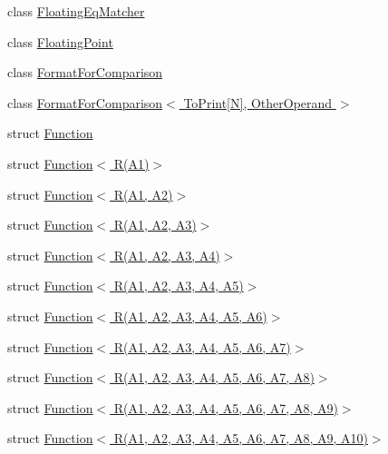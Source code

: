 \begin{DoxyCompactItemize}
\item 
class \hyperlink{classtesting_1_1internal_1_1FloatingEqMatcher}{Floating\+Eq\+Matcher}
\item 
class \hyperlink{classtesting_1_1internal_1_1FloatingPoint}{Floating\+Point}
\item 
class \hyperlink{classtesting_1_1internal_1_1FormatForComparison}{Format\+For\+Comparison}
\item 
class \hyperlink{classtesting_1_1internal_1_1FormatForComparison_3_01ToPrint[N]_00_01OtherOperand_01_4}{Format\+For\+Comparison$<$ To\+Print\mbox{[}\+N\mbox{]}, Other\+Operand $>$}
\item 
struct \hyperlink{structtesting_1_1internal_1_1Function}{Function}
\item 
struct \hyperlink{structtesting_1_1internal_1_1Function_3_01R_07A1_08_4}{Function$<$ R(\+A1)$>$}
\item 
struct \hyperlink{structtesting_1_1internal_1_1Function_3_01R_07A1_00_01A2_08_4}{Function$<$ R(\+A1, A2)$>$}
\item 
struct \hyperlink{structtesting_1_1internal_1_1Function_3_01R_07A1_00_01A2_00_01A3_08_4}{Function$<$ R(\+A1, A2, A3)$>$}
\item 
struct \hyperlink{structtesting_1_1internal_1_1Function_3_01R_07A1_00_01A2_00_01A3_00_01A4_08_4}{Function$<$ R(\+A1, A2, A3, A4)$>$}
\item 
struct \hyperlink{structtesting_1_1internal_1_1Function_3_01R_07A1_00_01A2_00_01A3_00_01A4_00_01A5_08_4}{Function$<$ R(\+A1, A2, A3, A4, A5)$>$}
\item 
struct \hyperlink{structtesting_1_1internal_1_1Function_3_01R_07A1_00_01A2_00_01A3_00_01A4_00_01A5_00_01A6_08_4}{Function$<$ R(\+A1, A2, A3, A4, A5, A6)$>$}
\item 
struct \hyperlink{structtesting_1_1internal_1_1Function_3_01R_07A1_00_01A2_00_01A3_00_01A4_00_01A5_00_01A6_00_01A7_08_4}{Function$<$ R(\+A1, A2, A3, A4, A5, A6, A7)$>$}
\item 
struct \hyperlink{structtesting_1_1internal_1_1Function_3_01R_07A1_00_01A2_00_01A3_00_01A4_00_01A5_00_01A6_00_01A7_00_01A8_08_4}{Function$<$ R(\+A1, A2, A3, A4, A5, A6, A7, A8)$>$}
\item 
struct \hyperlink{structtesting_1_1internal_1_1Function_3_01R_07A1_00_01A2_00_01A3_00_01A4_00_01A5_00_01A6_00_01A7_00_01A8_00_01A9_08_4}{Function$<$ R(\+A1, A2, A3, A4, A5, A6, A7, A8, A9)$>$}
\item 
struct \hyperlink{structtesting_1_1internal_1_1Function_3_01R_07A1_00_01A2_00_01A3_00_01A4_00_01A5_00_01A6_00_01A7_00_01A8_00_01A9_00_01A10_08_4}{Function$<$ R(\+A1, A2, A3, A4, A5, A6, A7, A8, A9, A10)$>$}

\end{DoxyCompactItemize}
